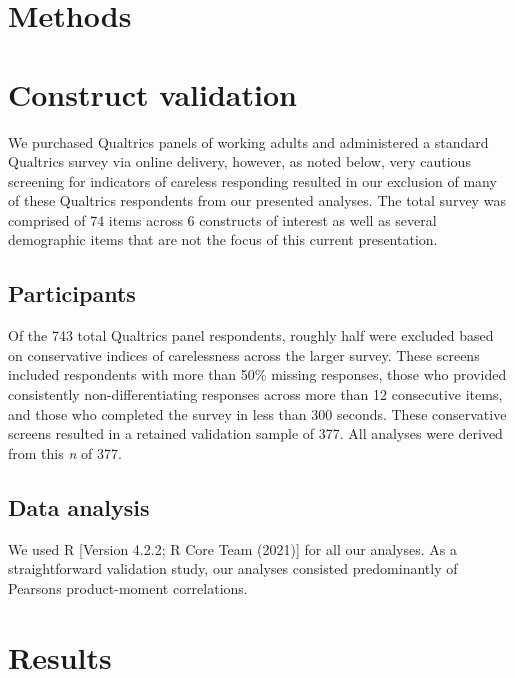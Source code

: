 \documentclass[
  man]{apa6}
\begin{document}
\hypertarget{methods}{%
\section{Methods}\label{methods}}

\hypertarget{construct-validation}{%
\section{Construct validation}\label{construct-validation}}

We purchased Qualtrics panels of working adults and administered a standard Qualtrics survey via online delivery, however, as noted below, very cautious screening for indicators of careless responding resulted in our exclusion of many of these Qualtrics respondents from our presented analyses. The total survey was comprised of 74 items across 6 constructs of interest as well as several demographic items that are not the focus of this current presentation.

\hypertarget{participants}{%
\subsection{Participants}\label{participants}}

Of the 743 total Qualtrics panel respondents, roughly half were excluded based on conservative indices of carelessness across the larger survey. These screens included respondents with more than 50\% missing responses, those who provided consistently non-differentiating responses across more than 12 consecutive items, and those who completed the survey in less than 300 seconds. These conservative screens resulted in a retained validation sample of 377. All analyses were derived from this \emph{n} of 377.

\hypertarget{data-analysis}{%
\subsection{Data analysis}\label{data-analysis}}

We used R {[}Version 4.2.2; R Core Team (2021){]} for all our analyses. As a straightforward validation study, our analyses consisted predominantly of Pearsons product-moment correlations.

\hypertarget{results}{%
\section{Results}\label{results}}
\end{document}
